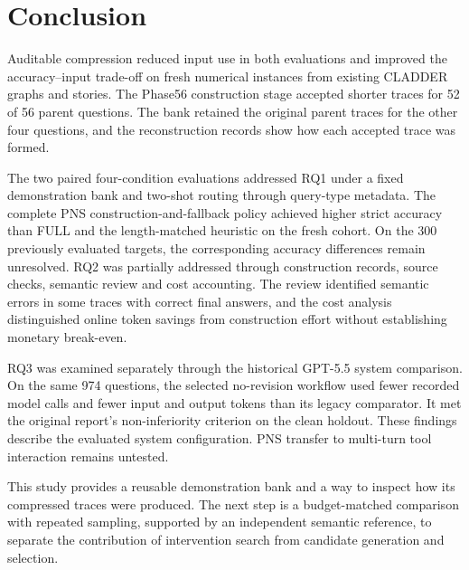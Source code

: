 \chapter{Conclusion}\label{ch:8}

Auditable compression reduced input use in both evaluations and improved the accuracy--input trade-off on fresh numerical instances from existing CLADDER graphs and stories. The Phase56 construction stage accepted shorter traces for 52 of 56 parent questions. The bank retained the original parent traces for the other four questions, and the reconstruction records show how each accepted trace was formed.

The two paired four-condition evaluations addressed RQ1 under a fixed demonstration bank and two-shot routing through query-type metadata. The complete PNS construction-and-fallback policy achieved higher strict accuracy than FULL and the length-matched heuristic on the fresh cohort. On the 300 previously evaluated targets, the corresponding accuracy differences remain unresolved. RQ2 was partially addressed through construction records, source checks, semantic review and cost accounting. The review identified semantic errors in some traces with correct final answers, and the cost analysis distinguished online token savings from construction effort without establishing monetary break-even.

RQ3 was examined separately through the historical GPT-5.5 system comparison. On the same 974 questions, the selected no-revision workflow used fewer recorded model calls and fewer input and output tokens than its legacy comparator. It met the original report's non-inferiority criterion on the clean holdout. These findings describe the evaluated system configuration. PNS transfer to multi-turn tool interaction remains untested.

This study provides a reusable demonstration bank and a way to inspect how its compressed traces were produced. The next step is a budget-matched comparison with repeated sampling, supported by an independent semantic reference, to separate the contribution of intervention search from candidate generation and selection.

\label{end:mainmatter}
